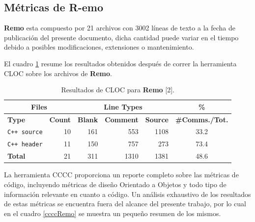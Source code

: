 \subsection{Métricas de R-emo}
\par \textbf{Remo} esta compuesto por 21 archivos con 3002 líneas de texto a la fecha de publicación del presente documento, dicha cantidad puede variar en el tiempo debido a posibles modificaciones, extensiones o mantenimiento.

\par El cuadro \ref{clocRemo} resume los resultados obtenidos después de correr la herramienta CLOC sobre los archivos de \textbf{Remo}.

\begin{table}[!htf]
    \begin{center}
    \begin{tabular}{|l|r|r|r|r|c|}
    \hline
    \multicolumn{2}{|c|}{Files} & \multicolumn{3}{|c|}{Line Types} & \hspace{0.2cm}\% \\
    \hline
    \textbf{Type} & \textbf{Count} & \textbf{Blank} & \textbf{Comment} & \textbf{Source} & \small{\textbf{\#Comms./Tot.}}\\
    \hline
    \texttt{C++ source} & 10 & 161 & 553 & 1108 & 33.2 \\
    \hline
    \texttt{C++ header} & 11 & 150 & 757 & 273 & 73.4 \\
    \hline
    \textbf{Total}      & 21 & 311 & 1310 & 1381 & 48.6 \\
    \hline
    \end{tabular}
    \caption{Resultados de CLOC para \textbf{Remo} [2].}
    \label{clocRemo}
    \end{center}
\end{table}

\par La herramienta CCCC proporciona un reporte completo sobre las métricas de código, incluyendo métricas de diseño Orientado a Objetos y todo tipo de información relevante en cuanto a código. Un análisis exhaustivo de los resultados de estas métricas se encuentra fuera del alcance del presente trabajo, por lo cual en el cuadro \ref{ccccRemo} se muestra un pequeño resumen de los mismos.

